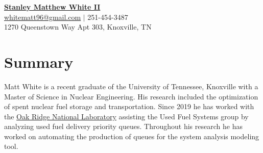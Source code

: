 \documentclass[letterpaper,10pt]{article}
\newcommand{\resumeSubHeadingListStart}{\begin{itemize}[leftmargin=*]}
\newcommand{\resumeSubHeadingListEnd}{\end{itemize}}
\newcommand{\shorterSection}[1]{\vspace{-10pt}\section{#1}}
\begin{document}
\begin{center}
  \small \textbf{\href{abhoi.github.io}{\huge Stanley Matthew White II}} \\ 
  \vspace{1mm}
  \href{mailto:whitematt96@gmail.com}{\color{blue}\underline{whitematt96@gmail.com}} $\vert$
  251-454-3487 \\
  \vspace{1mm}
  \small 1270 Queenstown Way Apt 303, Knoxville, TN
\end{center}

\shorterSection{Summary}
\vspace{4pt}
Matt White is a recent graduate of the University of Tennessee, Knoxville with a Master of Science in Nuclear Engineering. His research included the optimization of spent nuclear fuel storage and transportation. Since 2019 he has worked with the \href{https://www.ornl.gov/}{{\color{blue}Oak Ridge National Laboratory}} assisting the Used Fuel Systems group by analyzing used fuel delivery priority queues. Throughout his research he has worked on automating the production of queues for the system analysis modeling tool.
     \vspace{10pt}
\end{document}
